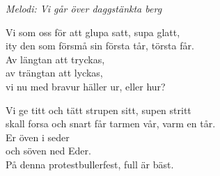 {\footnotesize\textit{Melodi: Vi går över daggstänkta berg}}\par
\vspace{10pt}
Vi som oss för att glupa satt, supa glatt,\\
ity den som försmå sin första tår, törsta får.\\
Av längtan att tryckas,\\
av trängtan att lyckas,\\
vi nu med bravur häller ur, eller hur?\par
\vspace{10pt}
Vi ge titt och tätt strupen sitt, supen stritt\\
skall forsa och snart får tarmen vår, varm en tår.\\
Er öven i seder\\
och söven ned Eder.\\
På denna protestbullerfest, full är bäst.
